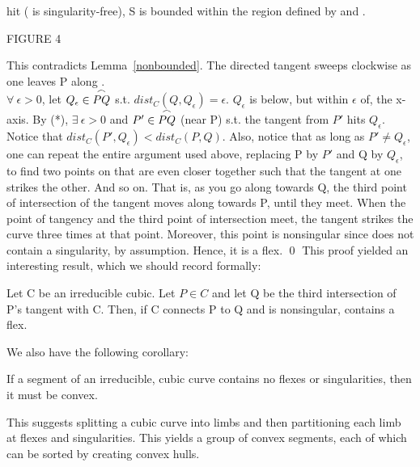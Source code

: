 hit  ( is singularity-free), S is bounded within the region 
defined by  and .
\begin{center}
FIGURE 4
\end{center}
This contradicts Lemma~\ref{nonbounded}.
\hence The directed tangent sweeps clockwise as one 
\marginpar{(*)}
leaves P along .\\
$\forall\ \epsilon > 0$, let $Q_{\epsilon} \in \mbox{$\stackrel{\frown}{PQ}$}$ s.t.
$dist_{C}(Q,Q_{\epsilon}) = \epsilon$.
$Q_{\epsilon}$ is below, but within $\epsilon$ of, the x-axis.
By (*), $\exists\ \epsilon > 0$ and $P' \in \mbox{$\stackrel{\frown}{PQ}$}$ (near P) s.t. the
tangent from $P'$ hits $Q_{\epsilon}$.
Notice that $dist_{C}(P',Q_{\epsilon}) < dist_{C}(P,Q)$.
Also, notice that as long as $P' \neq Q_{\epsilon}$, 
one can repeat the entire argument used above, replacing P by
$P'$ and Q by $Q_{\epsilon}$, to find two points on  that
are even closer together such that the tangent at one strikes the other.
And so on.
That is, as you go along  towards Q, the third point of intersection
of the tangent moves along  towards P, until they meet.
When the point of tangency and the third point of intersection meet, 
the tangent strikes the curve three times at that point.
Moreover, this point is nonsingular since  does not
contain a singularity, by assumption.  Hence, it is a flex.
\qed
This proof yielded an interesting result, which we should record formally:
\begin{lemma}\nopagebreak
Let C be an irreducible cubic.  Let $P \in C$ and let Q be the third 
intersection of P's tangent with C.  Then, if C connects P to Q
and  is nonsingular,
 contains a flex.
\end{lemma}
We also have the following corollary:
\begin{corollary}\nopagebreak
If a segment of an irreducible, cubic curve contains no flexes or 
singularities, then it must be convex.
\end{corollary}
This suggests splitting a cubic curve into limbs and then partitioning 
each limb at flexes and singularities.  This yields a group of convex
segments, each of which can be sorted by creating convex hulls.
